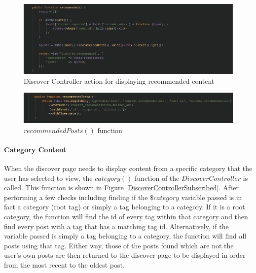 \begin{figure}[H]
\centering
\includegraphics[width=\textwidth]{Images/Implementation/DiscoverControllerRecommended}
\caption{Discover Controller action for displaying recommended content }
\label{fig:DiscoverControllerRecommended}
\end{figure}

\begin{figure}[H]
\centering
\includegraphics[width=\textwidth]{Images/Implementation/RecommendedPosts}
\caption{\(recommendedPosts()\) function}
\label{fig:RecommendedPosts}
\end{figure}

\paragraph{Category Content}
When the discover page needs to display content from a specific category that the user has selected to view, the \(category()\) function of the \(Discover  Controller\) is called. This function is shown in Figure \ref{DiscoverControllerSubscribed}. After performing a few checks including finding if the \(\$category\) variable passed is in fact a category (root tag) or simply a tag belonging to a category. If it is a root category, the function will find the id of every tag within that category and then find every post with a tag that has a matching tag id. Alternatively, if the variable passed is simply a tag belonging to a category, the function will find all posts using that tag. Either way, those of the posts found which are not the user's own posts are then returned to the discover page to be displayed in order from the most recent to the oldest post.


